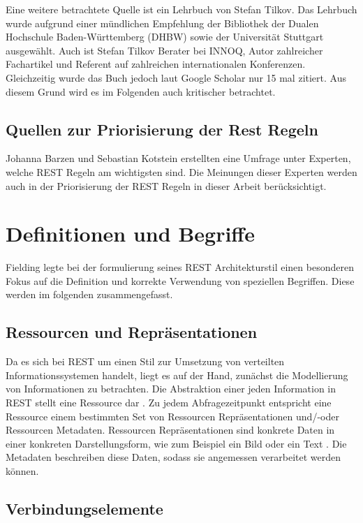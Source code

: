 Eine weitere betrachtete Quelle ist ein Lehrbuch von Stefan Tilkov. Das Lehrbuch wurde aufgrund einer mündlichen Empfehlung der Bibliothek der Dualen Hochschule Baden-Württemberg (DHBW) sowie der Universität Stuttgart ausgewählt. Auch ist Stefan Tilkov Berater bei INNOQ, Autor zahlreicher Fachartikel und Referent auf zahlreichen internationalen Konferenzen. Gleichzeitig wurde das Buch jedoch laut Google Scholar nur 15 mal zitiert. Aus diesem Grund wird es im Folgenden auch kritischer betrachtet.

\subsection{Quellen zur Priorisierung der Rest Regeln}\label{subsection:quellen-zur-priorisierung}

Johanna Barzen und Sebastian Kotstein erstellten eine Umfrage unter Experten, welche REST Regeln am wichtigsten sind. Die Meinungen dieser Experten werden auch in der Priorisierung der REST Regeln in dieser Arbeit berücksichtigt.

\section{Definitionen und Begriffe}\label{subsection:definitionen-und-begriffe}

Fielding legte bei der formulierung seines REST Architekturstil einen besonderen Fokus auf die Definition und korrekte Verwendung von speziellen Begriffen. Diese werden im folgenden zusammengefasst.

\subsection{Ressourcen und Repräsentationen}\label{subsection:ressourcen-und-repraesentationen}

Da es sich bei REST um einen Stil zur Umsetzung von verteilten Informationssystemen handelt, liegt es auf der Hand, zunächst die Modellierung von Informationen zu betrachten. Die Abstraktion einer jeden Information in REST stellt eine Ressource dar . Zu jedem Abfragezeitpunkt entspricht eine Ressource einem bestimmten Set von Ressourcen Repräsentationen und/-oder Ressourcen Metadaten. Ressourcen Repräsentationen sind konkrete Daten in einer konkreten Darstellungsform, wie zum Beispiel ein Bild oder ein Text  . Die Metadaten beschreiben diese Daten, sodass sie angemessen verarbeitet werden können.

\subsection{Verbindungselemente}\label{subsection:verbindungselemente}

